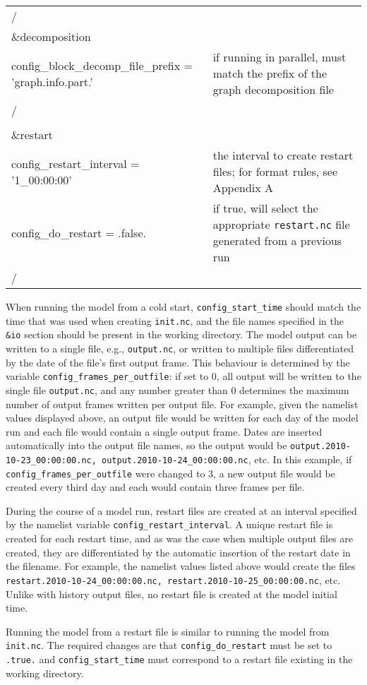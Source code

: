 \begin{longtable}{p{3.0in} |p{3.25in}}
/ 
\\
\&decomposition                                            & \\
   config\_block\_decomp\_file\_prefix = 'graph.info.part.' & if running in parallel, must match the prefix of the graph decomposition file \\
/                                                    & \\
\\
\&restart                                            & \\
   config\_restart\_interval = '1\_00:00:00'         & the interval to create restart files; for format rules, see Appendix A \\
   config\_do\_restart = .false.                     & if true, will select the appropriate {\tt restart.nc} file generated from a previous run \\
/ 
\end{longtable}

When running the model from a cold start, {\tt config\_start\_time} should match the time that was used when creating {\tt init.nc}, and the file names specified in the {\tt \&io} section should be present in the working directory.  The model output can be written to a single file, e.g., {\tt output.nc}, or written to multiple files differentiated by the date of the file's first output frame.  This behaviour is determined by the variable {\tt config\_frames\_per\_outfile}: if set to 0, all output will be written to the single file {\tt output.nc}, and any number greater than 0 determines the maximum number of output frames written per output file.  For example, given the namelist values displayed above, an output file would be written for each day of the model run and each file would contain a single output frame.  Dates are inserted automatically into the output file names, so the output would be {\tt output.2010-10-23\_00:00:00.nc, output.2010-10-24\_00:00:00.nc}, etc.  In this example, if {\tt config\_frames\_per\_outfile} were changed to 3, a new output file would be created every third day and each would contain three frames per file.

During the course of a model run, restart files are created at an interval specified by the namelist variable {\tt config\_restart\_interval}.  A unique restart file is created for each restart time, and as was the case when multiple output files are created, they are differentiated by the automatic insertion of the restart date in the filename.  For example, the namelist values listed above would create the files {\tt restart.2010-10-24\_00:00:00.nc, restart.2010-10-25\_00:00:00.nc}, etc. Unlike with history output files, no restart file is created at the model initial time.

Running the model from a restart file is similar to running the model from {\tt init.nc}.  The required changes are that {\tt config\_do\_restart} must be set to {\tt .true.} and {\tt config\_start\_time} must correspond to a restart file existing in the working directory.

